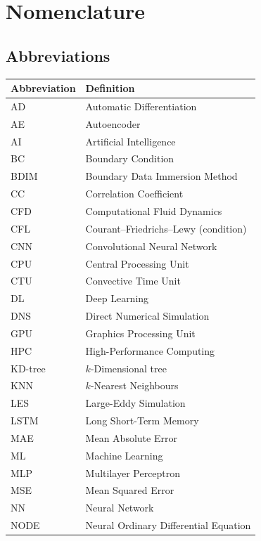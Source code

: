 \chapter*{Nomenclature}

\section*{Abbreviations}

\begin{longtable}{p{2.5cm}p{10cm}}
    \toprule
    Abbreviation & Definition \\
    \midrule\endhead
    AD     & Automatic Differentiation \\
    AE     & Autoencoder \\
    AI     & Artificial Intelligence \\
    BC     & Boundary Condition \\
    BDIM   & Boundary Data Immersion Method \\
    CC     & Correlation Coefficient \\
    CFD    & Computational Fluid Dynamics \\
    CFL    & Courant--Friedrichs--Lewy (condition) \\
    CNN    & Convolutional Neural Network \\
    CPU    & Central Processing Unit \\
    CTU    & Convective Time Unit \\
    DL     & Deep Learning \\
    DNS    & Direct Numerical Simulation \\
    GPU    & Graphics Processing Unit \\
    HPC    & High-Performance Computing \\
    KD-tree & $k$-Dimensional tree \\
    KNN    & $k$-Nearest Neighbours \\
    LES    & Large-Eddy Simulation \\
    LSTM   & Long Short-Term Memory \\
    MAE    & Mean Absolute Error \\
    ML     & Machine Learning \\
    MLP    & Multilayer Perceptron \\
    MSE    & Mean Squared Error \\
    NN     & Neural Network \\
    NODE   & Neural Ordinary Differential Equation \\

\end{longtable}

